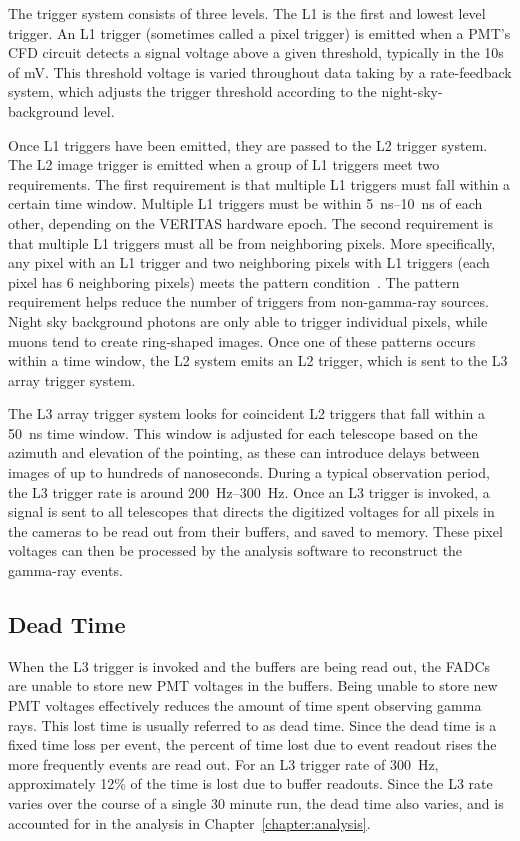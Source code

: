 The trigger system consists of three levels.
The L1 is the first and lowest level trigger.
An L1 trigger (sometimes called a pixel trigger) is emitted when a PMT's CFD circuit detects a signal voltage above a given threshold, typically in the 10s of mV.
This threshold voltage is varied throughout data taking by a rate-feedback system, which adjusts the trigger threshold according to the night-sky-background level.

Once L1 triggers have been emitted, they are passed to the L2 trigger system.
The L2 image trigger is emitted when a group of L1 triggers meet two requirements.
The first requirement is that multiple L1 triggers must fall within a certain time window.
Multiple L1 triggers must be within \SIrange{5}{10}{ns} of each other, depending on the VERITAS hardware epoch.
The second requirement is that multiple L1 triggers must all be from neighboring pixels.
More specifically, any pixel with an L1 trigger and two neighboring pixels with L1 triggers (each pixel has 6 neighboring pixels) meets the pattern condition~\cite{veritas_v6_trigger}.
The pattern requirement helps reduce the number of triggers from non-gamma-ray sources.
Night sky background photons are only able to trigger individual pixels, while muons tend to create ring-shaped images.
Once one of these patterns occurs within a time window, the L2 system emits an L2 trigger, which is sent to the L3 array trigger system.

The L3 array trigger system looks for coincident L2 triggers that fall within a \nicetilde\SI{50}{ns} time window.
This window is adjusted for each telescope based on the azimuth and elevation of the pointing, as these can introduce delays between images of up to hundreds of nanoseconds.
During a typical observation period, the L3 trigger rate is around \SIrange{200}{300}{Hz}.
Once an L3 trigger is invoked, a signal is sent to all telescopes that directs the digitized voltages for all pixels in the cameras to be read out from their buffers, and saved to memory.
These pixel voltages can then be processed by the analysis software to reconstruct the gamma-ray events.



\subsection{Dead Time}
When the L3 trigger is invoked and the buffers are being read out, the FADCs are unable to store new PMT voltages in the buffers.
Being unable to store new PMT voltages effectively reduces the amount of time spent observing gamma rays.
This lost time is usually referred to as dead time.
Since the dead time is a fixed time loss per event, the percent of time lost due to event readout rises the more frequently events are read out.
For an L3 trigger rate of \nicetilde{}\SI{300}{Hz}, approximately 12\% of the time is lost due to buffer readouts.
Since the L3 rate varies over the course of a single 30 minute run, the dead time also varies, and is accounted for in the analysis in Chapter~\ref{chapter:analysis}.

